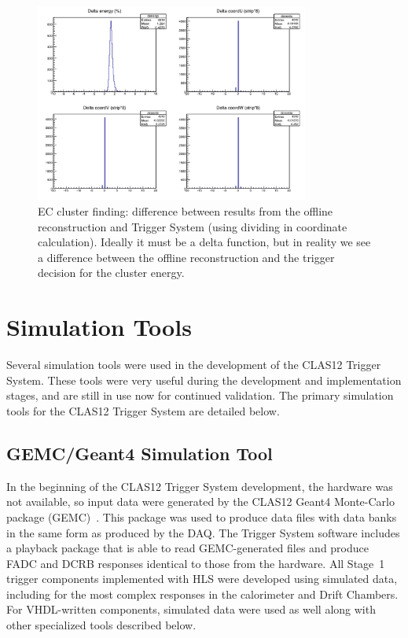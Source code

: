 \begin{figure}[htp]
	\begin{center}
		\centering
		\includegraphics[width=9.0cm]{img/ecal_sim1.png}
		\caption{EC cluster finding: difference between results from the offline reconstruction and Trigger
                  System (using dividing in coordinate calculation). Ideally it must be a delta function, but in reality we
                  see a difference between the offline reconstruction and the trigger decision for the cluster energy.}
		\label{fig:ecal_sim1}
	\end{center}
\end{figure} 

\section{Simulation Tools}

Several simulation tools were used in the development of the CLAS12 Trigger System. These tools were very
useful during the development and implementation stages, and are still in use now for continued validation. The
primary simulation tools for the CLAS12 Trigger System are detailed below.

\subsection{GEMC/Geant4 Simulation Tool}

In the beginning of the CLAS12 Trigger System development, the hardware was not available, so input data
were generated by the CLAS12 Geant4 Monte-Carlo package (GEMC)~\cite{gemc-ref}. This package was
used to produce data files with data banks in the same form as produced by the DAQ. The Trigger System
software includes a playback package that is able to read GEMC-generated files and produce FADC and DCRB
responses identical to those from the hardware. All Stage~1 trigger components implemented with HLS were
developed using simulated data, including for the most complex responses in the calorimeter and Drift Chambers.
For VHDL-written components, simulated data were used as well along with other specialized tools described
below.

